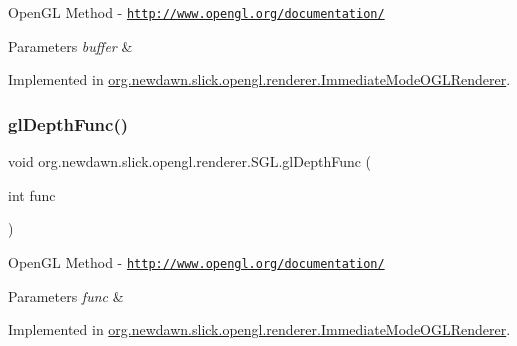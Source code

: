 Open\+GL Method -\/  \href{http://www.opengl.org/documentation/}{\tt http\+://www.\+opengl.\+org/documentation/}


\begin{DoxyParams}{Parameters}
{\em buffer} & \\
\hline
\end{DoxyParams}


Implemented in \mbox{\hyperlink{classorg_1_1newdawn_1_1slick_1_1opengl_1_1renderer_1_1_immediate_mode_o_g_l_renderer_a34a5863e766c0b3698ff867c9fa1ab98}{org.\+newdawn.\+slick.\+opengl.\+renderer.\+Immediate\+Mode\+O\+G\+L\+Renderer}}.

\mbox{\label{interfaceorg_1_1newdawn_1_1slick_1_1opengl_1_1renderer_1_1_s_g_l_a3704d17846e7513cc280e6275c73ace9}} 
\subsubsection{\texorpdfstring{gl\+Depth\+Func()}{glDepthFunc()}}
{\footnotesize\ttfamily void org.\+newdawn.\+slick.\+opengl.\+renderer.\+S\+G\+L.\+gl\+Depth\+Func (\begin{DoxyParamCaption}\item[{int}]{func }\end{DoxyParamCaption})}

Open\+GL Method -\/  \href{http://www.opengl.org/documentation/}{\tt http\+://www.\+opengl.\+org/documentation/}


\begin{DoxyParams}{Parameters}
{\em func} & \\
\hline
\end{DoxyParams}


Implemented in \mbox{\hyperlink{classorg_1_1newdawn_1_1slick_1_1opengl_1_1renderer_1_1_immediate_mode_o_g_l_renderer_ac17c1e89d64197a6541946906de1c663}{org.\+newdawn.\+slick.\+opengl.\+renderer.\+Immediate\+Mode\+O\+G\+L\+Renderer}}.

\mbox{\label{interfaceorg_1_1newdawn_1_1slick_1_1opengl_1_1renderer_1_1_s_g_l_a38dbc27d7cec53cf04ff1d98fd8c15e0}} 
